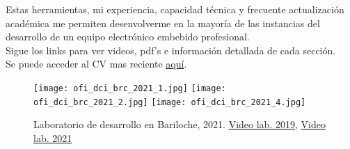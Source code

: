 Estas herramientas, mi experiencia, capacidad técnica y frecuente actualización académica me
permiten desenvolverme en la mayoría de las instancias del desarrollo de un
equipo electrónico embebido profesional.\\
Sigue los links para ver videos, pdf's e información detallada de cada sección.\\
Se puede acceder al CV mas reciente \href{\linkgithubcvpdf}{aquí}.\\
  \begin{figure}
      \begin{center}
         \texttt{[image: ofi\_dci\_brc\_2021\_1.jpg]}
         \texttt{[image: ofi\_dci\_brc\_2021\_2.jpg]}
         \texttt{[image: ofi\_dci\_brc\_2021\_4.jpg]}
      \end{center}
      \caption{Laboratorio de desarrollo en Bariloche, 2021. \href{\linkofidci}{Video lab. 2019}, \href{\linkofidcitwentyone}{Video lab. 2021}}
      \label{fig:ofi_dci}
   \end{figure}
\pagebreak

